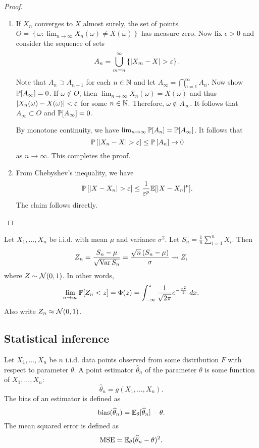 \documentclass[a4paper]{article}
\begin{document}
\begin{proof}

\begin{enumerate}
  \item If $X_n$ converges to $X$ almost surely, 
  the set of points $O = \left\{ \omega : \lim_{n \to \infty}
  X_n(\omega) \neq X(\omega) \right\}$ has measure zero.
  Now fix $\epsilon > 0$ and consider the sequence of 
  sets 
  \[
  A_n = \bigcup_{m = n}^\infty \left\{ \abs{X_m - X} > \epsilon \right\}.
  \]
  Note that $A_n \supset A_{n+1}$ for each $n \in \N$ and 
  let $A_\infty = \bigcap_{n=1}^\infty A_n$. 
  Now show $\P[A_\infty] = 0$. If $\omega \notin O$, then 
  $\lim_{n \to \infty} X_n (\omega) = X(\omega)$ and thus 
  $\abs{X_n(\omega) - X(\omega)} < \epsilon$ for some $n \in \N$.
  Therefore, $\omega \notin A_\infty$.
  It follows that $A_\infty \subset O$ and $\P[A_\infty] = 0$. 
  
  By monotone 
  continuity, we have $\lim_{n \to \infty} \P[A_n] = 
  \P[A_\infty]$. It follows that
  \[
  \P \left[ \abs{X_n - X} > \epsilon \right] 
  \leq \P \left[ A_n \right] \to 0 
  \]
  as $n \to \infty$. This completes the proof.

  \item From Chebyshev's inequality, we have 
  \[
  \Prob \left[ \abs{X - X_n} > \epsilon \right] \leq 
  \frac{1}{\epsilon^p} \E [\abs{X - X_n}^p].
  \]
  The claim follows directly.
\end{enumerate}

\end{proof}

\begin{thm}
  Let $X_1, \dots, X_n$ be i.i.d. with mean $\mu$ and variance 
  $\sigma^2$. Let $S_n = \frac{1}{n} \sum_{i=1}^n X_i$.
  Then 
  \[
  Z_n = \frac{S_n - \mu}{\sqrt{\var S_n}}
  = \frac{\sqrt{n} \left( S_n - \mu \right)}{\sigma} 
  \convDist Z,
  \]
  where $Z \sim \normal(0, 1)$. In other words, 
  \[
  \lim_{n \to \infty} \P[Z_n < z] = \Phi(z) 
  = \int_{-\infty}^z \frac{1}{\sqrt{2\pi}} e^{- \frac{x^2}{2}} 
  \; dx.
  \]
  Also write $Z_n \approx \normal(0, 1)$.
\end{thm}

\subsection{Statistical inference}

\begin{defi}
  Let $X_1, \dots, X_n$ be $n$ i.i.d. data points observed 
  from some distribution $F$ with respect to parameter 
  $\theta$. A point estimator $\hat{\theta}_n$ 
  of the parameter $\theta$ is some function of 
  $X_1, \dots, X_n$:
  \[
  \hat{\theta}_n = g(X_1, \dots, X_n).
  \]
  The bias of an estimator is defined as 
  \[
  \bias (\hat{\theta}_n)  
  = \E_\theta [\hat{\theta}_n] - \theta.
  \]
  The mean squared error is defined as 
  \[
  \mse = \E_\theta (\hat{\theta}_n - \theta)^2.
  \]
\end{defi}
\end{document}
